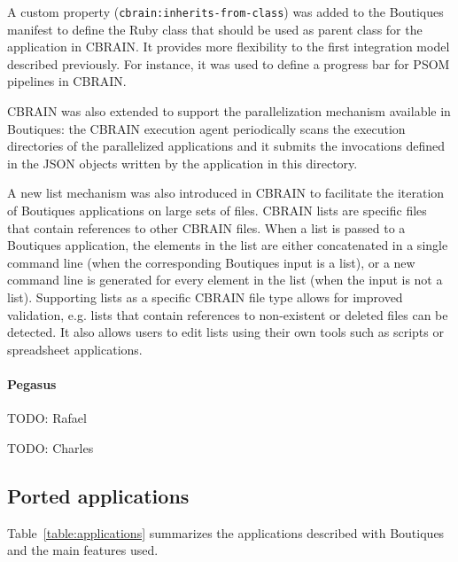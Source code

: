 \documentclass{article}
\newcommand{\todo}[2]{\color{red}TODO: #1\color{black}}
\begin{document}
A custom property (\texttt{cbrain:inherits-from-class}) was added to
the Boutiques manifest to define the Ruby class that should be used as
parent class for the application in CBRAIN. It provides more
flexibility to the first integration model described previously. For
instance, it was used to define a progress bar for PSOM pipelines in
CBRAIN.

CBRAIN was also extended to support the parallelization mechanism
available in Boutiques: the CBRAIN execution agent periodically scans
the execution directories of the parallelized applications and it submits
the invocations defined in the JSON objects written by the
application in this directory.

A new list mechanism was also introduced in CBRAIN to facilitate the
iteration of Boutiques applications on large sets of files. CBRAIN
lists are specific files that contain references to other CBRAIN
files. When a list is passed to a Boutiques application, the elements
in the list are either concatenated in a single command line (when the
corresponding Boutiques input is a list), or a new command line is
generated for every element in the list (when the input is not a
list). Supporting lists as a specific CBRAIN file type allows for
improved validation, e.g. lists that contain references to
non-existent or deleted files can be detected. It also allows users to
edit lists using their own tools such as scripts or spreadsheet
applications.

\paragraph{Pegasus}

\todo{Rafael}

\paragraph{SPINE}

\todo{Charles}

\paragraph{VIP}


\subsection{Ported applications}


Table~\ref{table:applications} summarizes the applications described
with Boutiques and the main features used.
\end{document}
